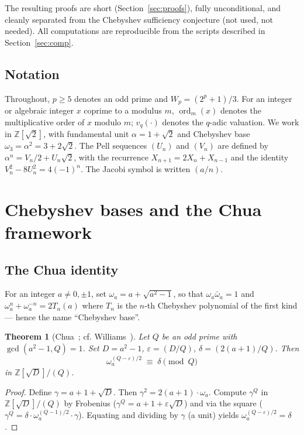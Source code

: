 \documentclass[11pt,a4paper]{amsart}
\theoremstyle{plain}
\newtheorem{theorem}{Theorem}[section]
\theoremstyle{definition}
\DeclareMathOperator{\ord}{ord}
\newcommand{\Z}{\mathbb{Z}}
\newcommand{\wom}{\omega_3}
\newcommand{\sqrttwo}{\sqrt{2}}
\begin{document}
The resulting proofs are short (Section~\ref{sec:proofs}), fully
unconditional, and cleanly separated from the Chebyshev sufficiency
conjecture (not used, not needed). All computations are reproducible
from the scripts described in Section~\ref{sec:comp}.

\subsection{Notation}

Throughout, $p \geq 5$ denotes an odd prime and $W_p = (2^p + 1)/3$.
For an integer or algebraic integer $x$ coprime to a modulus $m$,
$\ord_m(x)$ denotes the multiplicative order of $x$ modulo $m$;
$v_q(\cdot)$ denotes the $q$-adic valuation. We work in
$\Z[\sqrttwo]$, with fundamental unit $\alpha = 1 + \sqrttwo$ and
Chebyshev base $\wom = \alpha^2 = 3 + 2\sqrttwo$. The Pell sequences
$(U_n)$ and $(V_n)$ are defined by $\alpha^n = V_n/2 + U_n \sqrttwo$,
with the recurrence $X_{n+1} = 2 X_n + X_{n-1}$ and the identity
$V_n^2 - 8 U_n^2 = 4(-1)^n$. The Jacobi symbol is written $(a/n)$.

\section{Chebyshev bases and the Chua framework}

\subsection{The Chua identity}

For an integer $a \neq 0, \pm 1$, set $\omega_a = a + \sqrt{a^2 - 1}$,
so that $\omega_a \bar\omega_a = 1$ and $\omega_a^n + \omega_a^{-n} =
2 T_n(a)$ where $T_n$ is the $n$-th Chebyshev polynomial of the first
kind --- hence the name ``Chebyshev base''.

\begin{theorem}[Chua~\cite{Chua}; cf. Williams~{\cite[Ch.~4]{Williams}}]
\label{thm:chua}
Let $Q$ be an odd prime with $\gcd(a^2 - 1, Q) = 1$. Set
$D = a^2 - 1$, $\varepsilon = (D/Q)$, $\delta = (2(a+1)/Q)$. Then
\[
  \omega_a^{(Q - \varepsilon)/2} \;\equiv\; \delta \pmod{Q}
\]
in $\Z[\sqrt{D}]/(Q)$.
\end{theorem}

\begin{proof}
Define $\gamma = a + 1 + \sqrt{D}$. Then $\gamma^2 = 2(a+1) \cdot
\omega_a$. Compute $\gamma^Q$ in $\Z[\sqrt{D}]/(Q)$ by Frobenius
($\gamma^Q = a + 1 + \varepsilon\sqrt{D}$) and via the square
($\gamma^Q = \delta \cdot \omega_a^{(Q-1)/2} \cdot \gamma$). Equating
and dividing by $\gamma$ (a unit) yields $\omega_a^{(Q -
\varepsilon)/2} = \delta$.
\end{proof}
\end{document}
